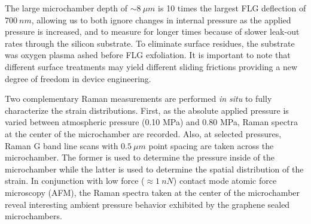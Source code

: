 The large microchamber depth of $\sim 8 \ \mu m$ is 10 times the largest FLG deflection of $700 \ nm$, allowing us to both ignore changes in internal pressure as the applied pressure is increased, and to measure for longer times because of slower leak-out rates through the silicon substrate.
To eliminate surface residues, the substrate was oxygen plasma ashed before FLG exfoliation.
It is important to note that different surface treatments may yield different sliding frictions providing a new degree of freedom in device engineering. 

Two complementary Raman measurements are performed \emph{in situ} to fully characterize the strain distributions.
First, as the absolute applied pressure is varied between atmospheric pressure (0.10 MPa) and 0.80 MPa, Raman spectra at the center of the microchamber are recorded.
Also, at selected pressures, Raman G band line scans with $ 0.5 \ \mu m$ point spacing are taken across the microchamber.
The former is used to determine the pressure inside of the microchamber while the latter is used to determine the spatial distribution of the strain.
In conjunction with low force ($\approx 1 \ nN$) contact mode atomic force microscopy (AFM), the Raman spectra taken at the center of the microchamber reveal interesting ambient pressure behavior exhibited by the graphene sealed microchambers.

